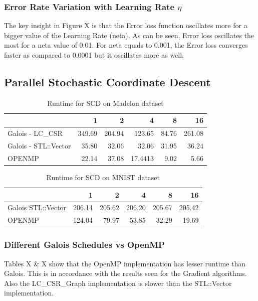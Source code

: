 \documentclass{sigplanconf}
\begin{document}
	\subsubsection{Error Rate Variation with Learning Rate \(\eta\) }
	The key insight in Figure X is that the Error loss function oscillates more for a bigger value of the Learning Rate (neta).
	As can be seen, Error loss oscillates the most for a neta value of 0.01. For neta equals to 0.001, the Error loss converges faster
	as compared to 0.0001 but it oscillates more as well.

\subsection{Parallel Stochastic Coordinate Descent}
\begin{table}[htbp]
\caption{Runtime for SCD on Madelon dataset}
\begin{tabular}{|l|r|r|r|r|r|}
\hline
 & 1 & 2 & 4 & 8 & 16 \\ \hline
Galois - LC\_CSR & 349.69 & 204.94 & 123.65 & 84.76 & 261.08 \\ \hline
Galois - STL::Vector  & 35.80 & 32.06 & 32.06 & 31.95 & 36.24 \\ \hline
OPENMP & 22.14 & 37.08 & 17.4413 & 9.02 & 5.66 \\ \hline
\end{tabular}
\label{Label of the table}
\end{table}

\begin{table}[htbp]
\caption{Runtime for SCD on MNIST dataset}
\begin{tabular}{|l|r|r|r|r|r|}
\hline
 & 1 & 2 & 4 & 8 & 16 \\ \hline
Galois STL::Vector & 206.14 & 205.62 & 206.20 & 205.67 & 205.42 \\ \hline
OPENMP & 124.04 & 79.97 & 53.85 & 32.29 & 19.69 \\ \hline
\end{tabular}
\label{Label of the table}
\end{table}

\subsubsection{Different Galois Schedules vs OpenMP}
Tables X & X show that the OpenMP implementation has lesser runtime than Galois. This is in accordance with the results seen for the Gradient
algorithms. Also the LC\_CSR\_Graph implementation is slower than the STL::Vector implementation. 
\end{document}
